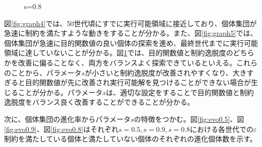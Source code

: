 \documentclass[a4paper,12pt]{jsreport}
\begin{document}
\begin{figure}[htbp]
  \begin{center}
  \hfill
  \hfill
  \end{center}
    
  \caption{s=0.8}
  \label{fig:graph6}
\end{figure}

図\ref{fig:graph4}では、50世代頃にすでに実行可能領域に接近しており、個体集団が急速に制約を満たすような動きをすることが分かる。また、図\ref{fig:graph5}では、個体集団が急速に目的関数値の良い個体の探索を進め、最終世代までに実行可能領域に達していないことが分かる。図\ref{fig:graph6}では、目的関数値と制約逸脱度のどちらかを改善に偏ることなく、両方をバランスよく探索できているといえる。これらのことから、パラメータ$s$が小さいと制約逸脱度が改善されやすくなり、大きすぎると目的関数値が先に改善され実行可能解を見つけることができない場合が生じることが分かる。パラメータ$s$は、適切な設定をすることで目的関数値と制約逸脱度をバランス良く改善することができることが分かる。

次に、個体集団の進化率からパラメータ$s$の特徴をつかむ。図\ref{fig:evo0.5}、図\ref{fig:evo0.9}、図\ref{fig:evo0.8}はそれぞれ$s=0.5,s=0.9,s=0.8$における各世代での$\varepsilon$制約を満たしている個体と満たしていない個体のそれぞれの進化個体数を示す。
\end{document}

